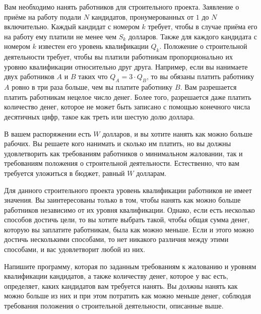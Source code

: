 Вам необходимо нанять работников для строительного проекта. Заявление о приёме на работу
подали $N$ кандидатов, пронумерованных от $1$ до $N$ включительно. Каждый кандидат с номером $k$ требует, чтобы в случае приёма его на работу ему платили не менее чем $S_k$ долларов. Также для каждого кандидата с номером $k$ известен его уровень квалификации $Q_k$. Положение о строительной деятельности требует, чтобы вы платили работникам пропорционально их уровню квалификации относительно друг друга. Например, если вы нанимаете двух работников $A$ и $B$ таких что $Q_A = 3 \cdot Q_B$, то вы обязаны платить работнику $A$ ровно в три раза больше, чем вы платите работнику $B$. Вам разрешается платить работникам нецелое число денег. Более того, разрешается даже платить количество денег, которое не может быть записано с помощью конечного числа десятичных цифр, такое как треть или шестую долю доллара.

В вашем распоряжении есть $W$ долларов, и вы хотите нанять как можно больше рабочих. Вы
решаете кого нанимать и сколько им платить, но вы должны удовлетворить как требованиям
работников о минимальном жаловании, так и требованиям положения о строительной
деятельности. Естественно, что вам требуется уложиться в бюджет, равный $W$ долларам.

Для данного строительного проекта уровень квалификации работников не имеет значения. Вы
заинтересованы только в том, чтобы нанять как можно больше работников независимо от их
уровня квалификации. Однако, если есть несколько способов достичь цели, то вы хотите выбрать такой, чтобы общая сумма денег, которую вы заплатите работникам, была как можно меньше. Если и этого можно достичь несколькими способами, то нет никакого различия между этими способами, и вас удовлетворит любой из них.

Напишите программу, которая по заданным требованиям к жалованию и уровням квалификации
кандидатов, а также количеству денег, которое у вас есть, определяет, каких кандидатов вам
требуется нанять. Вы должны нанять как можно больше из них и при этом потратить как можно
меньше денег, соблюдая требования положения о строительной деятельности, описанные выше.
